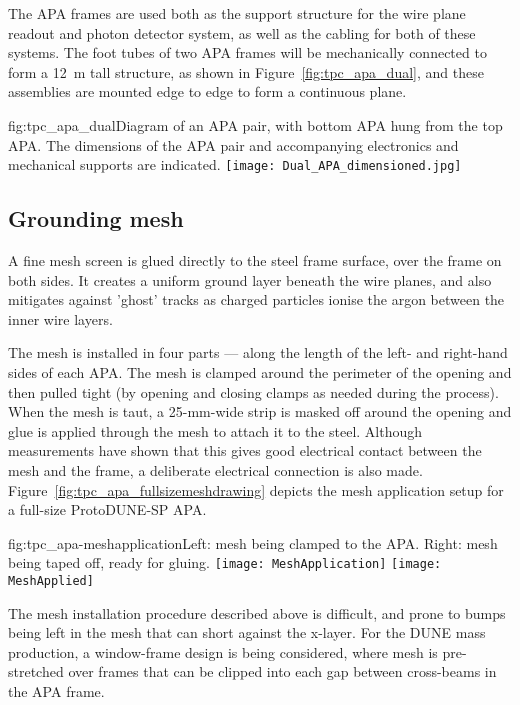 The APA frames are used both as the support structure for the wire plane readout and photon detector system, as well as the cabling for both of these systems. The foot tubes of two APA frames will be mechanically connected to form a 12~m tall structure, as shown in Figure~\ref{fig:tpc_apa_dual}, and these assemblies are mounted edge to edge to form a continuous plane. 

\begin{dunefigure}{fig:tpc_apa_dual}{Diagram of an APA pair,
    with bottom APA hung from the top APA. The dimensions of the APA pair and
    accompanying electronics and mechanical supports are indicated.}
\texttt{[image: Dual\_APA\_dimensioned.jpg]} 
\end{dunefigure}


\subsection{Grounding mesh}
\label{sec:fdsp-apa-mesh}

A fine mesh screen is glued directly to the steel frame surface, over the frame on both sides.  It creates a uniform ground layer beneath the wire planes, and also mitigates against 'ghost' tracks as charged particles ionise the argon between the inner wire layers.

The mesh is installed in four parts --- along the length of the left- and right-hand sides of each APA. The mesh is clamped around the perimeter of the opening and then pulled tight (by opening and closing clamps as needed during the process).  When the mesh is taut, a 25-mm-wide strip is masked off around the opening and glue is applied through the mesh to attach it to the steel.  Although measurements have shown that this gives good electrical contact between the mesh and the frame, a deliberate electrical connection is also made.  Figure~\ref{fig:tpc_apa_fullsizemeshdrawing} depicts the mesh application setup for a full-size ProtoDUNE-SP APA.

\begin{dunefigure}{fig:tpc_apa-meshapplication}{Left: mesh being clamped to the APA. Right: mesh being taped off, ready for gluing.}
\texttt{[image: MeshApplication]} 
\texttt{[image: MeshApplied]} 
\end{dunefigure}

The mesh installation procedure described above is difficult, and prone to bumps being left in the mesh that can short against the x-layer. For the DUNE mass production, a window-frame design is being considered, where mesh is pre-stretched over frames that can be clipped into each gap between cross-beams in the APA frame.


